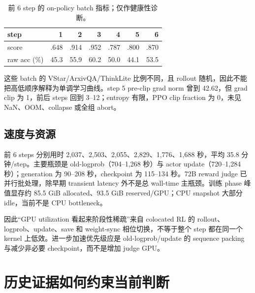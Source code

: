 \documentclass[UTF8,twocolumn,10pt,a4paper]{ctexart}
\begin{document}
\begin{table}[t]
\centering
\caption{前 6 step 的 on-policy batch 指标；仅作健康性诊断。}
\label{tab:step-series}
\scriptsize
\begin{tabular}{lrrrrrr}
\toprule
step & 1 & 2 & 3 & 4 & 5 & 6 \\
\midrule
score & .648 & .914 & .952 & .787 & .800 & .870 \\
raw acc (\%) & 45.3 & 55.9 & 60.2 & 50.0 & 44.1 & 53.5 \\
\bottomrule
\end{tabular}
\end{table}

这些 batch 的 VStar/ArxivQA/ThinkLite 比例不同，且 rollout 随机，因此不能把高低顺序解释为单调学习曲线。step 5 pre-clip grad norm 曾到 42.62，但 grad clip 为 1，前后 steps 回到 3--12；entropy 有限，PPO clip fraction 为 0，未见 NaN、OOM、collapse 或全组 abort。

\subsection{速度与资源}

前 6 steps 分别用时 2,037、2,503、2,055、2,829、1,776、1,688 秒，平均 35.8 分钟/step。主要瓶颈是 old-logprob（704--1,268 秒）与 actor update（720--1,284 秒）；generation 为 90--208 秒，checkpoint 为 115--134 秒。72B reward judge 已并行批处理，除早期 transient latency 外不是总 wall-time 主瓶颈。训练 phase 峰值显存约 85.5 GiB allocated、93.5 GiB reserved/GPU；CPU snapshot 大部分 idle，当前不是 CPU bottleneck。

因此“GPU utilization 看起来阶段性稀疏”来自 colocated RL 的 rollout、logprob、update、save 和 weight-sync 相位切换，不等于整个 step 都在同一个 kernel 上低效。进一步加速优先级应是 old-logprob/update 的 sequence packing 与减少非必要 checkpoint，而不是增加 judge GPU。

\section{历史证据如何约束当前判断}
\end{document}
